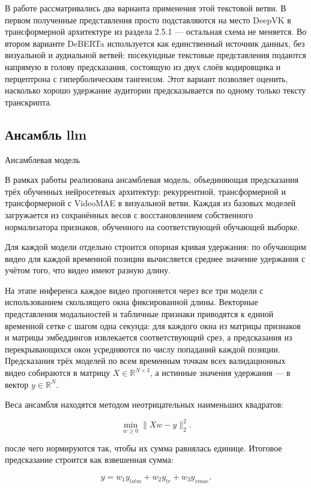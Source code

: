 \documentclass[times]{itmo-student-thesis}
\begin{document}
В работе рассматривались два варианта применения этой текстовой ветви. В первом полученные представления просто подставляются на место DeepVK в трансформерной архитектуре из раздела 2.5.1 — остальная схема не меняется. Во втором варианте DeBERTa используется как единственный источник данных, без визуальной и аудиальной ветвей: посекундные текстовые представления подаются напрямую в голову предсказания, состоящую из двух слоёв кодировщика и перцептрона с гиперболическим тангенсом. Этот вариант позволяет оценить, насколько хорошо удержание аудитории предсказывается по одному только тексту транскрипта.

\subsection{Ансамбль llm}

Ансамблевая модель

В рамках работы реализована ансамблевая модель, объединяющая предсказания трёх обученных нейросетевых архитектур: рекуррентной, трансформерной и трансформерной с VideoMAE в визуальной ветви. Каждая из базовых моделей загружается из сохранённых весов с восстановлением собственного нормализатора признаков, обученного на соответствующей обучающей выборке.

Для каждой модели отдельно строится опорная кривая удержания: по обучающим видео для каждой временной позиции вычисляется среднее значение удержания с учётом того, что видео имеют разную длину.

На этапе инференса каждое видео прогоняется через все три модели с использованием скользящего окна фиксированной длины. Векторные представления модальностей и табличные признаки приводятся к единой временной сетке с шагом одна секунда: для каждого окна из матрицы признаков и матрицы эмбеддингов извлекается соответствующий срез, а предсказания из перекрывающихся окон усредняются по числу попаданий каждой позиции. Предсказания трёх моделей по всем временным точкам всех валидационных видео собираются в матрицу $X\in\mathbb{R}^{N\times 3}$, а истинные значения удержания — в вектор $y\in\mathbb{R}^{N}$.

Веса ансамбля находятся методом неотрицательных наименьших квадратов:

\[
\min_{w\ge 0}\lVert Xw-y\rVert_2^2.
\]

после чего нормируются так, чтобы их сумма равнялась единице. Итоговое предсказание строится как взвешенная сумма:

\[
y=w_1y_{lstm}+w_2y_{tr}+w_3y_{vmae}.
\]
\end{document}
